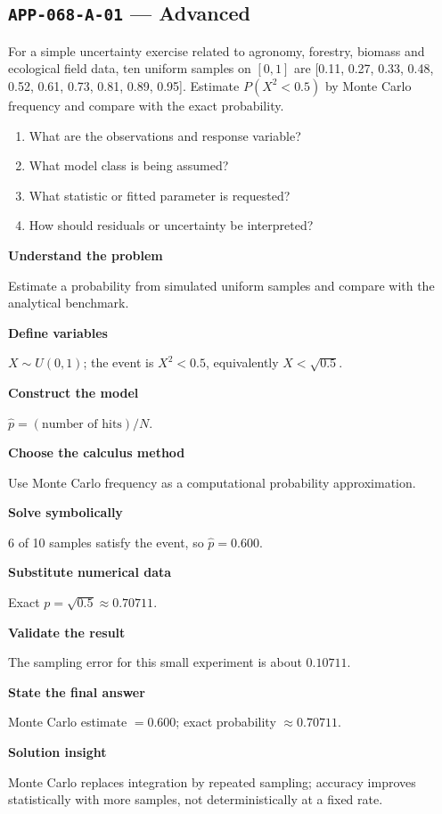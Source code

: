 \documentclass[11pt]{book}
\newcommand{\pid}[1]{\texttt{#1}}
\begin{document}
\subsection*{\pid{APP-068-A-01} — Advanced}
\begin{problembox}
For a simple uncertainty exercise related to agronomy, forestry, biomass and ecological field data, ten uniform samples on $[0,1]$ are [0.11, 0.27, 0.33, 0.48, 0.52, 0.61, 0.73, 0.81, 0.89, 0.95]. Estimate $P(X^2<0.5)$ by Monte Carlo frequency and compare with the exact probability.
\end{problembox}
\begin{promptbox}\begin{enumerate}
\item What are the observations and response variable?
\item What model class is being assumed?
\item What statistic or fitted parameter is requested?
\item How should residuals or uncertainty be interpreted?
\end{enumerate}\end{promptbox}
\begin{solutionbox}
\textbf{Understand the problem}\par Estimate a probability from simulated uniform samples and compare with the analytical benchmark.\par\medskip
\textbf{Define variables}\par $X\sim U(0,1)$; the event is $X^2<0.5$, equivalently $X<\sqrt{0.5}$.\par\medskip
\textbf{Construct the model}\par $\widehat p=(\text{number of hits})/N$.\par\medskip
\textbf{Choose the calculus method}\par Use Monte Carlo frequency as a computational probability approximation.\par\medskip
\textbf{Solve symbolically}\par 6 of 10 samples satisfy the event, so $\widehat p=0.600$.\par\medskip
\textbf{Substitute numerical data}\par Exact $p=\sqrt{0.5}\approx 0.70711$.\par\medskip
\textbf{Validate the result}\par The sampling error for this small experiment is about $0.10711$.\par\medskip
\textbf{State the final answer}\par Monte Carlo estimate $=0.600$; exact probability $\approx 0.70711$.\par\medskip
\textbf{Solution insight}\par Monte Carlo replaces integration by repeated sampling; accuracy improves statistically with more samples, not deterministically at a fixed rate.\par\medskip
\end{solutionbox}
\end{document}
